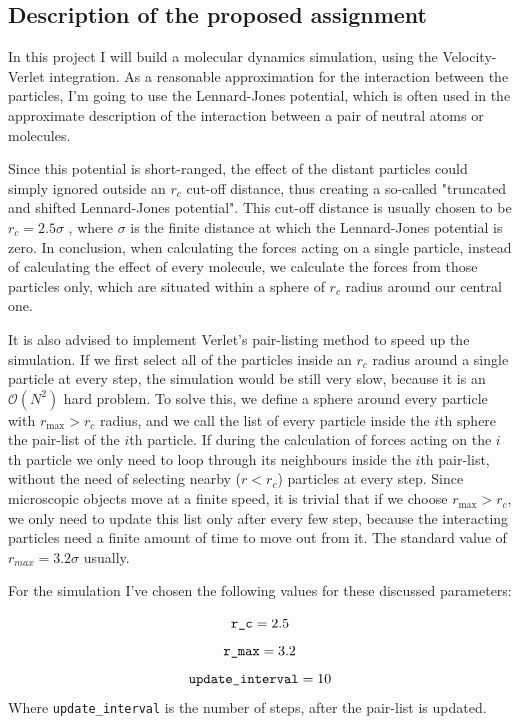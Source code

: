 \begin{multicols}{2}
\section{Description of the proposed assignment}
In this project I will build a molecular dynamics simulation, using the Velocity-Verlet integration. As a reasonable approximation for the interaction between the particles, I'm going to use the Lennard-Jones potential, which is often used in the approximate description of the interaction between a pair of neutral atoms or molecules. \par
Since this potential is short-ranged, the effect of the distant particles could simply ignored outside an $r_{c}$ cut-off distance, thus creating a so-called "truncated and shifted Lennard-Jones potential". This cut-off distance is usually chosen to be $r_{c} = 2.5 \sigma$ \citep{2011JChPh.134h1102T}, where $\sigma$ is the finite distance at which the Lennard-Jones potential is zero. In conclusion, when calculating the forces acting on a single particle, instead of calculating the effect of every molecule, we calculate the forces from those particles only, which are situated within a sphere of $r_{c}$ radius around our central one. \par
It is also advised to implement Verlet's pair-listing method to speed up the simulation. If we first select all of the particles inside an $r_{c}$ radius around a single particle at every step, the simulation would be still very slow, because it is an $\mathcal{O} \left( N^{2} \right)$ hard problem. To solve this, we define a sphere around every particle with $r_{\text{max}} > r_{c}$ radius, and we call the list of every particle inside the $i$th sphere the pair-list of the $i$th particle. If during the calculation of forces acting on the $i$th particle we only need to loop through its neighbours inside the $i$th pair-list, without the need of selecting nearby ($r < r_{c}$) particles at every step. Since microscopic objects move at a finite speed, it is trivial that if we choose $r_{\text{max}} > r_{c}$, we only need to update this list only after every few step, because the interacting particles need a finite amount of time to move out from it. The standard value of $r_{max} = 3.2 \sigma$ usually. \par
For the simulation I've chosen the following values for these discussed parameters:

\begin{equation}
\text{\texttt{r\_c}} = 2.5
\end{equation}
\begin{equation}
\text{\texttt{r\_max}} = 3.2
\end{equation}
\begin{equation}
\text{\texttt{update\_interval}} = 10
\end{equation}
Where \texttt{update\_interval} is the number of steps, after the pair-list is updated.


\end{multicols}
